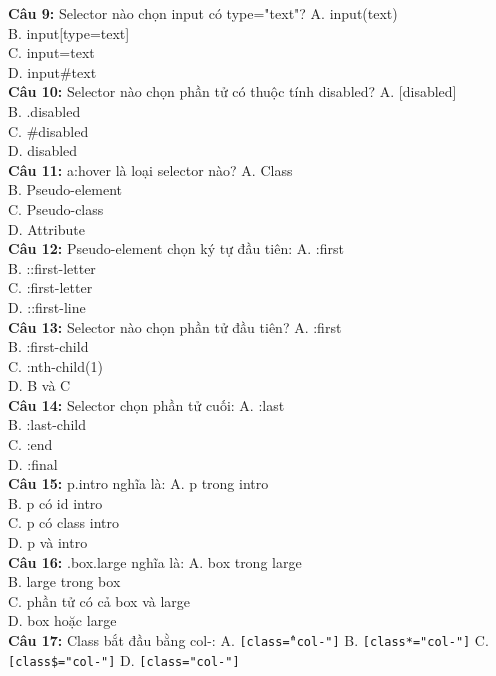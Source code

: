 \documentclass[12pt,a4paper]{article}
\begin{document}
\textbf{Câu 9:} Selector nào chọn input có type="text"?
A. input(text) \\
B. input[type=text] \\
C. input=text \\
D. input\#text \\

\textbf{Câu 10:} Selector nào chọn phần tử có thuộc tính disabled?
A. [disabled] \\
B. .disabled \\
C. \#disabled \\
D. disabled \\

\textbf{Câu 11:} a:hover là loại selector nào?
A. Class \\
B. Pseudo-element \\
C. Pseudo-class \\
D. Attribute \\

\textbf{Câu 12:} Pseudo-element chọn ký tự đầu tiên:
A. :first \\
B. ::first-letter \\
C. :first-letter \\
D. ::first-line \\

\textbf{Câu 13:} Selector nào chọn phần tử đầu tiên?
A. :first \\
B. :first-child \\
C. :nth-child(1) \\
D. B và C \\

\textbf{Câu 14:} Selector chọn phần tử cuối:
A. :last \\
B. :last-child \\
C. :end \\
D. :final \\

\textbf{Câu 15:} p.intro nghĩa là:
A. p trong intro \\
B. p có id intro \\
C. p có class intro \\
D. p và intro \\

\textbf{Câu 16:} .box.large nghĩa là:
A. box trong large \\
B. large trong box \\
C. phần tử có cả box và large \\
D. box hoặc large \\

\textbf{Câu 17:} Class bắt đầu bằng col-:
A. \texttt{[class\^="col-"]} 
B. \texttt{[class*="col-"]} 
C. \texttt{[class\$="col-"]} 
D. \texttt{[class="col-"]} 
\end{document}
